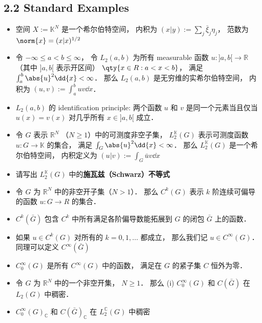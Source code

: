 \subsection{2.2 Standard Examples}

\begin{itemize}
\item 空间 $X := \mathbb K^N$ 是一个希尔伯特空间， 内积为 $(x|y) := \sum_j \bar \xi_j \eta_j$， 范数为 $\norm{x} = (x|x)^{1/2}$

\item 令 $-\infty \leqslant a < b \leqslant \infty$， 令 $L_2(a, b)$ 为所有 measurable 函数 $u :]a, b[ \to \mathbb R$（其中 $]a, b[$ 表示开区间） $\qty{x \in R : a < x < b}$， 满足 $\int_a^b \abs{u}^2 \dd{x} < \infty$． 那么 $L_2(a, b)$ 是无穷维的实希尔伯特空间， 内积为 $(u, v) := \int_a^b uv \dd{x}$．

\item $L_2(a, b)$ 的 identification principle: 两个函数 $u$ 和 $v$ 是同一个元素当且仅当 $u(x) = v(x)$ 对几乎所有 $x \in ]a, b[$ 成立．

\item 令 $G$ 表示 $\mathbb R^N$ （$N \geqslant 1$）中的可测度非空子集， $L_2^{\mathbb K}(G)$ 表示可测度函数 $u: G \to \mathbb K$ 的集合， 满足 $\int_G \abs{u}^2 \dd{x} < \infty$． 那么 $L_2^{\mathbb K}(G)$ 是一个希尔伯特空间， 内积定义为 $(u|v) := \int_G \bar u v \dd{x}$

\item 请写出 $L_2^{\mathbb K}(G)$ 中的\textbf{施瓦兹（Schwarz）不等式}

\item 令 $G$ 为 $\mathbb R^N$ 中的非空开子集（$N > 1$）． 那么 $C^k(G)$ 表示 $k$ 阶连续可偏导的函数 $u: G \to R$ 的集合．

\item $C^k(\bar G)$ 包含 $C^k$ 中所有满足各阶偏导数能拓展到 $G$ 的闭包 $\bar G$ 上的函数．

\item 如果 $u \in C^k(G)$ 对所有的 $k = 0, 1, \dots$ 都成立， 那么我们记 $u \in C^\infty(G)$． 同理可以定义 $C^\infty(\bar G)$

\item $C_0^\infty (G)$ 是所有 $C^\infty(G)$ 中的函数， 满足在 $G$ 的紧子集 $C$ 恒外为零．

\item 令 $G$ 为 $\mathbb R^N$ 中的一个非空开集， $N \geqslant 1$． 那么 (i) $C_0^\infty(G)$ 和 $C(\bar G)$ 在 $L_2(G)$ 中稠密．

\item $C_0^\infty(G)_{\mathbb C}$ 和 $C(\bar G)_{\mathbb C}$  在 $L_2^{\mathbb C}(G)$ 中稠密


\end{itemize}
